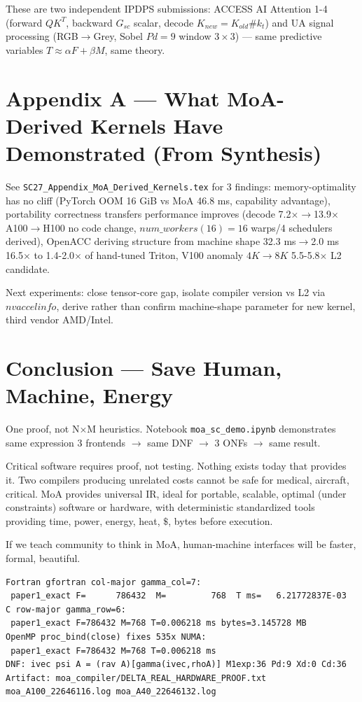 \documentclass[11pt]{article}
\begin{document}
These are two independent IPDPS submissions: ACCESS AI Attention 1-4 (forward $QK^T$, backward $G_{sc}$ scalar, decode $K_{new}=K_{old}\#k_t$) and UA signal processing (RGB$\rightarrow$Grey, Sobel $Pd=9$ window $3\times3$) — same predictive variables $T\approx\alpha F+\beta M$, same theory.

\section{Appendix A — What MoA-Derived Kernels Have Demonstrated (From Synthesis)}
See {\tt SC27\_Appendix\_MoA\_Derived\_Kernels.tex} for 3 findings: memory-optimality has no cliff (PyTorch OOM 16 GiB vs MoA 46.8 ms, capability advantage), portability correctness transfers performance improves (decode 7.2$\times\rightarrow$13.9$\times$ A100$\rightarrow$H100 no code change, $num\_workers(16)=16$ warps/4 schedulers derived), OpenACC deriving structure from machine shape 32.3 ms$\rightarrow$2.0 ms 16.5$\times$ to 1.4-2.0$\times$ of hand-tuned Triton, V100 anomaly $4K\rightarrow8K$ 5.5-5.8$\times$ L2 candidate.

Next experiments: close tensor-core gap, isolate compiler version vs L2 via $nvaccelinfo$, derive rather than confirm machine-shape parameter for new kernel, third vendor AMD/Intel.

\section{Conclusion — Save Human, Machine, Energy}
One proof, not N$\times$M heuristics. Notebook {\tt moa\_sc\_demo.ipynb} demonstrates same expression 3 frontends $\rightarrow$ same DNF $\rightarrow$ 3 ONFs $\rightarrow$ same result.

Critical software requires proof, not testing. Nothing exists today that provides it. Two compilers producing unrelated costs cannot be safe for medical, aircraft, critical. MoA provides universal IR, ideal for portable, scalable, optimal (under constraints) software or hardware, with deterministic standardized tools providing time, power, energy, heat, $\$$, bytes before execution.

If we teach community to think in MoA, human-machine interfaces will be faster, formal, beautiful.


\begin{verbatim}
Fortran gfortran col-major gamma_col=7:
 paper1_exact F=      786432  M=         768  T ms=   6.21772837E-03
C row-major gamma_row=6:
 paper1_exact F=786432 M=768 T=0.006218 ms bytes=3.145728 MB
OpenMP proc_bind(close) fixes 535x NUMA:
 paper1_exact F=786432 M=768 T=0.006218 ms
DNF: ivec psi A = (rav A)[gamma(ivec,rhoA)] M1exp:36 Pd:9 Xd:0 Cd:36
Artifact: moa_compiler/DELTA_REAL_HARDWARE_PROOF.txt moa_A100_22646116.log moa_A40_22646132.log
\end{verbatim}
\end{document}
